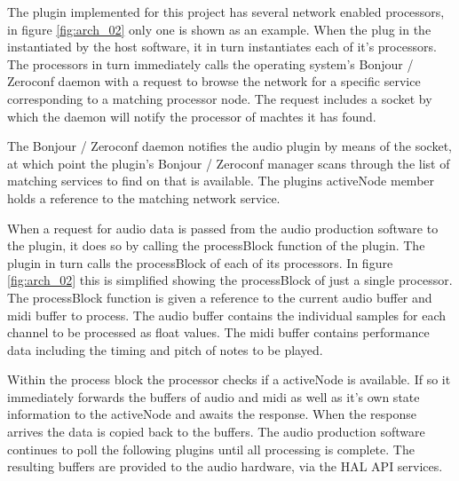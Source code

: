 The plugin implemented for this project has several network enabled processors, in figure \ref{fig:arch_02} only one is shown as an example. When the plug in the instantiated by the host software, it in turn instantiates each of it's processors. The processors in turn immediately calls the operating system's Bonjour / Zeroconf daemon with a request to browse the network for a specific service corresponding to a matching processor node. The request includes a socket by which the daemon will notify the processor of machtes it has found.

The Bonjour / Zeroconf daemon notifies the audio plugin by means of the socket, at which point the plugin's Bonjour / Zeroconf manager scans through the list of matching services to find on that is available. The plugins activeNode member holds a reference to the matching network service.

When a request for audio data is passed from the audio production software to the plugin, it does so by calling the processBlock function of the plugin. The plugin in turn calls the processBlock of each of its processors. In figure \ref{fig:arch_02} this is simplified showing the processBlock of just a single processor. The processBlock function is given a reference to the current audio buffer and midi buffer to process. The audio buffer contains the individual samples for each channel to be processed as float values. The midi buffer contains performance data including the timing and pitch of notes to be played.

Within the process block the processor checks if a activeNode is available. If so it immediately forwards the buffers of audio and midi as well as it's own state information to the activeNode and awaits the response. When the response arrives the data is copied back to the buffers. The audio production software continues to poll the following plugins until all processing is complete. The resulting buffers are provided to the audio hardware, via the HAL API services.
